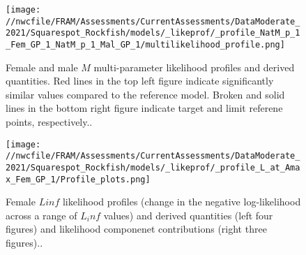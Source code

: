 \documentclass[11pt,
  english,
  a4paper,
]{article}
\begin{document}
\tagmcend\tagstructend


\begin{figure}
\centering
\texttt{[image: //nwcfile/FRAM/Assessments/CurrentAssessments/DataModerate\_2021/Squarespot\_Rockfish/models/\_likeprof/\_profile\_NatM\_p\_1\_Fem\_GP\_1\_NatM\_p\_1\_Mal\_GP\_1/multilikelihood\_profile.png]}
\caption{Female and male {\(M\)\leavevmode\tagmcend\tagstructend} multi-parameter likelihood profiles and derived quantities. Red lines in the top left figure indicate significantly similar values compared to the reference model. Broken and solid lines in the bottom right figure indicate target and limit referene points, respectively..\label{fig:M-multiprofile-combo}}
\end{figure}

\tagmcend\tagstructend


\begin{figure}
\centering
\texttt{[image: //nwcfile/FRAM/Assessments/CurrentAssessments/DataModerate\_2021/Squarespot\_Rockfish/models/\_likeprof/\_profile\_L\_at\_Amax\_Fem\_GP\_1/Profile\_plots.png]}
\caption{Female {\(Linf\)\leavevmode\tagmcend\tagstructend} likelihood profiles (change in the negative log-likelihood across a range of {\(L_inf\)\leavevmode\tagmcend\tagstructend} values) and derived quantities (left four figures) and likelihood componenet contributions (right three figures)..\label{fig:Linf_F-profile-combo}}
\end{figure}

\tagmcend\tagstructend

\end{document}
